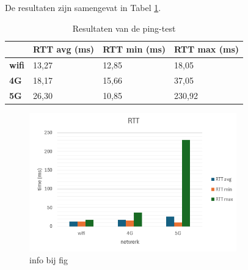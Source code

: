De resultaten zijn samengevat in Tabel \ref{tab:latency}.
\begin{table}[]
    \caption{Resultaten van de ping-test} \label{tab:latency}
        \begin{tabular}{l l l l}
            \cline{2-4}
            & \textbf{RTT avg (ms)} & \textbf{RTT min (ms)} & \textbf{RTT max (ms)} \\ \hline
            \multicolumn{1}{l}{\textbf{wifi}} & 13,27          & 12,85          & 18,05           \\ \hline
            \multicolumn{1}{l}{\textbf{4G}}   & 18,17         & 15,66           & 37,05           \\ \hline            
            \multicolumn{1}{l}{\textbf{5G}}   & 26,30           & 10,85            & 230,92         \\ \hline
        \end{tabular}
        
    
\end{table}

\begin{figure}
    \includegraphics[width=0.8\textwidth]{../graphics/RTT_grafiek.png}
    \caption[grafiek van latency test]{\label{fig:latency}info bij fig}
\end{figure}
